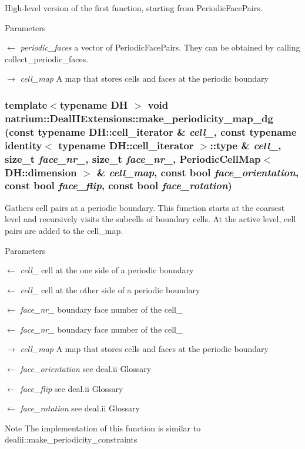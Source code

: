 High-\/level version of the first function, starting from PeriodicFacePairs. 
\begin{DoxyParams}{Parameters}
\item[\mbox{$\leftarrow$} {\em periodic\_\-faces}]a vector of PeriodicFacePairs. They can be obtained by calling collect\_\-periodic\_\-faces. \item[\mbox{$\rightarrow$} {\em cell\_\-map}]A map that stores cells and faces at the periodic boundary \end{DoxyParams}
\hypertarget{namespacenatrium_1_1DealIIExtensions_a6bc5b9999ee7c47791ea8754f586277e}{
\subsubsection[{make\_\-periodicity\_\-map\_\-dg}]{\setlength{\rightskip}{0pt plus 5cm}template$<$typename DH $>$ void natrium::DealIIExtensions::make\_\-periodicity\_\-map\_\-dg (const typename DH::cell\_\-iterator \& {\em cell\_}, \/  const typename identity$<$ typename DH::cell\_\-iterator $>$::type \& {\em cell\_}, \/  size\_\-t {\em face\_\-nr\_}, \/  size\_\-t {\em face\_\-nr\_}, \/  PeriodicCellMap$<$ DH::dimension $>$ \& {\em cell\_\-map}, \/  const bool {\em face\_\-orientation}, \/  const bool {\em face\_\-flip}, \/  const bool {\em face\_\-rotation})}}
\label{namespacenatrium_1_1DealIIExtensions_a6bc5b9999ee7c47791ea8754f586277e}


Gathers cell pairs at a periodic boundary. This function starts at the coarsest level and recursively visits the subcells of boundary cells. At the active level, cell pairs are added to the cell\_\-map. 
\begin{DoxyParams}{Parameters}
\item[\mbox{$\leftarrow$} {\em cell\_\-1}]cell at the one side of a periodic boundary \item[\mbox{$\leftarrow$} {\em cell\_\-2}]cell at the other side of a periodic boundary \item[\mbox{$\leftarrow$} {\em face\_\-nr\_\-1}]boundary face number of the cell\_ \item[\mbox{$\leftarrow$} {\em face\_\-nr\_\-2}]boundary face number of the cell\_ \item[\mbox{$\rightarrow$} {\em cell\_\-map}]A map that stores cells and faces at the periodic boundary \item[\mbox{$\leftarrow$} {\em face\_\-orientation}]see deal.ii Glossary \item[\mbox{$\leftarrow$} {\em face\_\-flip}]see deal.ii Glossary \item[\mbox{$\leftarrow$} {\em face\_\-rotation}]see deal.ii Glossary \end{DoxyParams}
\begin{DoxyNote}{Note}
The implementation of this function is similar to dealii::make\_\-periodicity\_\-constraints 
\end{DoxyNote}
